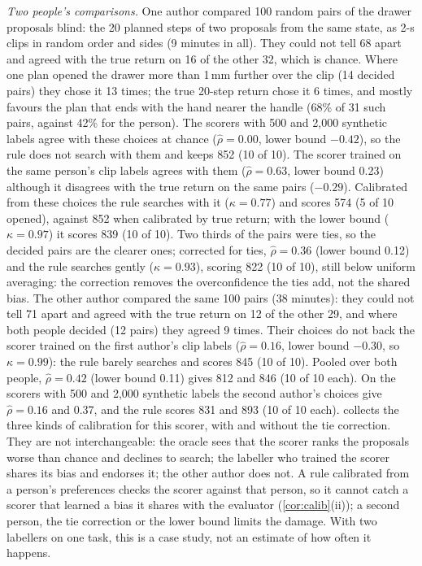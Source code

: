 \documentclass{article}
\theoremstyle{plain}
\theoremstyle{remark}
\begin{document}
\emph{Two people's comparisons.} One author compared 100 random pairs of the drawer proposals blind: the 20 planned
steps of two proposals from the same state, as 2-s clips in random order and sides (9 minutes in all). They could not
tell 68 apart and agreed with the true return on 16 of the other 32, which is chance. Where one plan opened the drawer
more than 1\,mm further over the clip (14 decided pairs) they chose it 13 times; the true 20-step return chose it 6
times, and mostly favours the plan that ends with the hand nearer the handle (68\% of 31 such pairs, against 42\% for
the person). The scorers with 500 and 2,000 synthetic labels agree with these choices at chance ($\hat\rho=0.00$, lower
bound $-0.42$), so the rule does not search with them and keeps 852 (10 of 10). The scorer trained on the same
person's clip labels agrees with them ($\hat\rho=0.63$, lower bound 0.23) although it disagrees with the true return on
the same pairs ($-0.29$). Calibrated from these choices the rule searches with it ($\kappa=0.77$) and scores 574 (5 of
10 opened), against 852 when calibrated by true return; with the lower bound ($\kappa=0.97$) it scores 839 (10 of 10).
Two thirds of the pairs were ties, so the decided pairs are the clearer ones; corrected for ties, $\hat\rho=0.36$
(lower bound 0.12) and the rule searches gently ($\kappa=0.93$), scoring 822 (10 of 10), still below uniform
averaging: the correction removes the overconfidence the ties add, not the shared bias.
The other author compared the same 100 pairs (38 minutes): they could not tell 71 apart and agreed with the true return
on 12 of the other 29, and where both people decided (12 pairs) they agreed 9 times. Their choices do not back the
scorer trained on the first author's clip labels ($\hat\rho=0.16$, lower bound $-0.30$, so $\kappa=0.99$): the rule
barely searches and scores 845 (10 of 10). Pooled over both people, $\hat\rho=0.42$ (lower bound 0.11) gives 812 and
846 (10 of 10 each). On the scorers with 500 and 2,000 synthetic labels the second author's choices give
$\hat\rho=0.16$ and 0.37, and the rule scores 831 and 893 (10 of 10 each).  collects the three kinds of calibration
for this scorer, with and without the tie correction. They are not interchangeable: the oracle sees that the scorer
ranks the proposals worse than chance and declines to search; the labeller who trained the scorer shares its bias and
endorses it; the other author does not. A rule calibrated from a person's preferences checks the scorer against that
person, so it cannot catch a scorer that learned a bias it shares with the evaluator (\cref{cor:calib}(ii)); a second
person, the tie correction or the lower bound limits the damage. With two labellers on one task, this is a case study,
not an estimate of how often it happens.
\end{document}
